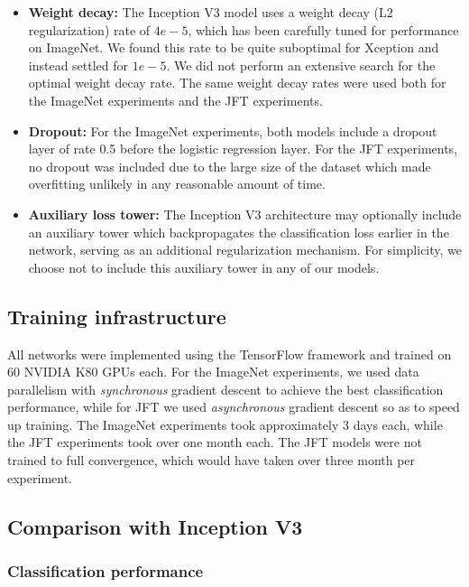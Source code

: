 \documentclass[10pt,twocolumn,letterpaper]{article}
\begin{document}
\begin{itemize}
\item \textbf{Weight decay:} The Inception V3 model uses a weight decay (L2 regularization) rate of $4e-5$, which has been carefully tuned for performance on ImageNet. We found this rate to be quite suboptimal for Xception and instead settled for $1e-5$. We did not perform an extensive search for the optimal weight decay rate. The same weight decay rates were used both for the ImageNet experiments and the JFT experiments.

\item \textbf{Dropout:} For the ImageNet experiments, both models include a dropout layer of rate 0.5 before the logistic regression layer. For the JFT experiments, no dropout was included due to the large size of the dataset which made overfitting unlikely in any reasonable amount of time.

\item \textbf{Auxiliary loss tower:} The Inception V3 architecture may optionally include an auxiliary tower which backpropagates the classification loss earlier in the network, serving as an additional regularization mechanism. For simplicity, we choose not to include this auxiliary tower in any of our models.

\end{itemize}


\subsection{Training infrastructure}

All networks were implemented using the TensorFlow framework \cite{tensorflow2015-whitepaper} and trained on 60 NVIDIA K80 GPUs each. For the ImageNet experiments, we used data parallelism with \textit{synchronous} gradient descent to achieve the best classification performance, while for JFT we used \textit{asynchronous} gradient descent so as to speed up training. The ImageNet experiments took approximately 3 days each, while the JFT experiments took over one month each. The JFT models were not trained to full convergence, which would have taken over three month per experiment.


\subsection{Comparison with Inception V3}

\subsubsection{Classification performance}
\end{document}
